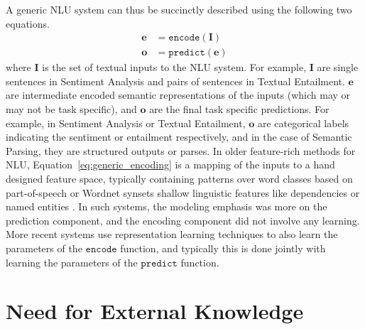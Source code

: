 A generic NLU system can thus be succinctly described using the following two equations.
\begin{align}
 \mathbf{e} &= \mathtt{encode}(\mathbf{I}) \label{eq:generic_encoding}\\
 \mathbf{o} &= \mathtt{predict}(\mathbf{e}) \label{eq:generic_prediction}
\end{align}
where $\mathbf{I}$ is the set of textual inputs to the NLU system. 
For example, $\mathbf{I}$  are single sentences in Sentiment Analysis and pairs of sentences in Textual Entailment. $\textbf{e}$ are intermediate 
encoded semantic representations of the inputs (which may or may not be task specific), and $\mathbf{o}$ are the final task specific predictions. For example, in Sentiment Analysis or Textual Entailment, 
$\mathbf{o}$ are categorical labels indicating the sentiment or entailment respectively, and in the case of Semantic Parsing, they are structured outputs or parses. In older feature-rich methods for NLU, 
Equation~\ref{eq:generic_encoding} is a mapping of the inputs to a hand designed feature space, typically containing patterns over word classes based on part-of-speech \cite{corley2005measuring} or Wordnet synsets \cite{moldovan2001logic} 
shallow linguistic features like dependencies \cite{bos2005recognising} or named entities \cite{tatu2005semantic}. In such systems,
the modeling emphasis was more on the prediction component, and the encoding component did not involve any learning. More recent systems \cite{weston2014memory,hermann2015teaching,Sukhbaatar2015EndToEndMN,Xiong2016DynamicMN} 
use representation learning techniques to also learn the parameters of the
$\mathtt{encode}$ function, and typically this is done jointly with learning the parameters of the $\mathtt{predict}$ function.

\section{Need for External Knowledge}
\label{sec:intro_external_knowledge}
